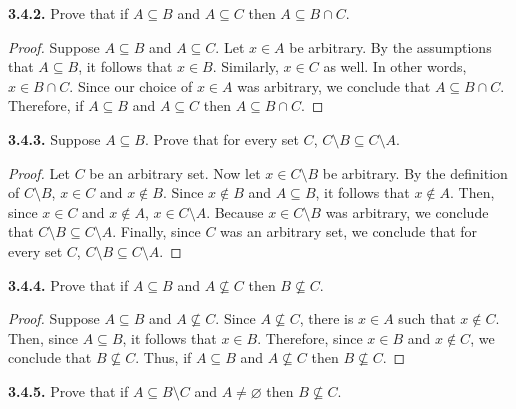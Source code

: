 \documentclass[12pt]{amsart}
\newenvironment{statement}[1]{\smallskip\noindent\color[rgb]{.6627, .3529, .6314} {\bf #1.}}{}
\theoremstyle{definition}
\theoremstyle{remark}
\begin{document}
\begin{statement}{3.4.2}
Prove that if $A \subseteq B$ and $A \subseteq C$ then $A \subseteq B \cap C$.
\end{statement}

\begin{proof}
Suppose $A \subseteq B$ and $A \subseteq C$.
Let $x \in A$ be arbitrary.
By the assumptions that $A \subseteq B$, it follows that $x \in B$.
Similarly, $x \in C$ as well.
In other words, $x \in B \cap C$.
Since our choice of $x \in A$ was arbitrary, we conclude that $A \subseteq B \cap C$.
Therefore, if $A \subseteq B$ and $A \subseteq C$ then $A \subseteq B \cap C$.
\end{proof}


\begin{statement}{3.4.3}
Suppose $A \subseteq B$.
Prove that for every set $C$, $C \setminus B \subseteq C \setminus A$.
\end{statement}

\begin{proof}
Let $C$ be an arbitrary set.
Now let $x \in C \setminus B$ be arbitrary.
By the definition of $C \setminus B$, $x \in C$ and $x \notin B$.
Since $x \notin B$ and $A \subseteq B$, it follows that $x \notin A$.
Then, since $x \in C$ and $x \notin A$, $x \in C \setminus A$.
Because $x \in C \setminus B$ was arbitrary, we conclude that $C \setminus B \subseteq C \setminus A$.
Finally, since $C$ was an arbitrary set, we conclude that for every set $C$, $C \setminus B \subseteq C \setminus A$.
\end{proof}


\begin{statement}{3.4.4}
Prove that if $A \subseteq B$ and $A \nsubseteq C$ then $B \nsubseteq C$.
\end{statement}

\begin{proof}
Suppose $A \subseteq B$ and $A \nsubseteq C$.
Since $A \nsubseteq C$, there is $x \in A$ such that $x \notin C$.
Then, since $A \subseteq B$, it follows that $x \in B$.
Therefore, since $x \in B$ and $x \notin C$, we conclude that $B \nsubseteq C$.
Thus, if $A \subseteq B$ and $A \nsubseteq C$ then $B \nsubseteq C$.
\end{proof}


\begin{statement}{3.4.5}
Prove that if $A \subseteq B \setminus C$ and $A \neq \varnothing$ then $B \nsubseteq C$.
\end{statement}
\end{document}
